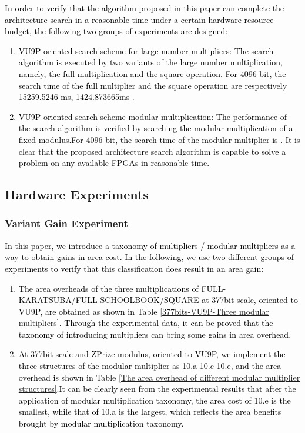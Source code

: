 \documentclass[conference]{IEEEtran}
\begin{document}
\textcolor{black}{
In order to verify that the algorithm proposed in this paper can complete the architecture search in a reasonable time under a certain hardware resource budget, the following two groups of experiments are designed:
\begin{enumerate} %
    \item VU9P-oriented search scheme for large number multipliers: The search algorithm is executed by two variants of the large number multiplication, namely, the full multiplication and the square operation. For 4096 bit, the search time of the full multiplier and the square operation are respectively 15259.5246 ms, 1424.873665ms .
    \item VU9P-oriented search scheme modular multiplication: The performance of the search algorithm is verified by searching the modular multiplication of a fixed modulus.For 4096 bit, the search time of the modular multiplier is .
    It is clear that the proposed architecture search algorithm is capable to solve a problem on any available FPGAs in reasonable time.
\end{enumerate}
}

\subsection{Hardware Experiments}

\subsubsection{Variant Gain Experiment}

\textcolor{black}{
In this paper, we introduce a taxonomy of multipliers / modular multipliers as a way to obtain gains in area cost. In the following, we use two different groups of experiments to verify that this classification does result in an area gain:
\begin{enumerate} [(1)]
    \item The area overheads of the three multiplications of FULL-KARATSUBA/FULL-SCHOOLBOOK/SQUARE at 377bit scale, oriented to VU9P, are obtained as shown in Table \ref{377bits-VU9P-Three modular multipliers}. Through the experimental data, it can be proved that the taxonomy of introducing multipliers can bring some gains in area overhead.
    \item At 377bit scale and ZPrize modulus, oriented to VU9P, we implement the three structures of the modular multiplier as 10.a 10.c 10.e, and the area overhead is shown in Table \ref{The area overhead of different modular multiplier structures}.It can be clearly seen from the experimental results that after the application of modular multiplication taxonomy, the area cost of 10.e is the smallest, while that of 10.a is the largest, which reflects the area benefits brought by modular multiplication taxonomy.
\end{enumerate}
}
\end{document}
